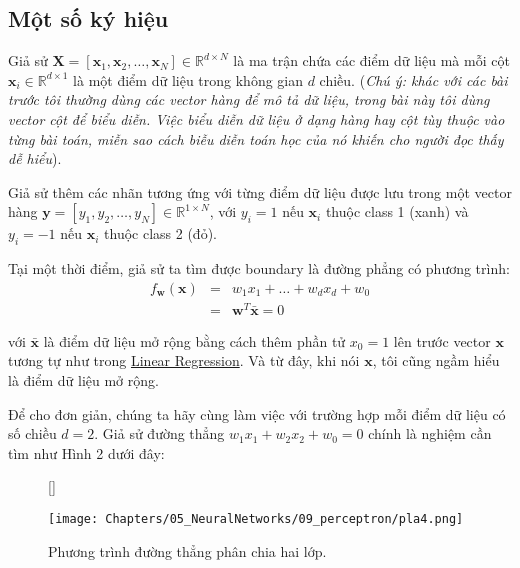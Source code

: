  
\subsection{Một số ký hiệu}
Giả sử $\mathbf{X} = [\mathbf{x}_1, \mathbf{x}_2, \dots, \mathbf{x}_N] \in \mathbb{R}^{d \times N}$ là ma trận chứa các điểm dữ liệu mà mỗi cột $\mathbf{x}_i \in \mathbb{R}^{d\times 1}$ là một điểm dữ liệu trong không gian $d$ chiều. (\textit{Chú ý: khác với các bài trước tôi thường dùng các vector hàng để mô tả dữ liệu, trong bài này tôi dùng vector cột để biểu diễn. Việc biểu diễn dữ liệu ở dạng hàng hay cột tùy thuộc vào từng bài toán, miễn sao cách biễu diễn toán học của nó khiến cho người đọc thấy dễ hiểu}). 
 
Giả sử thêm các nhãn tương ứng với từng điểm dữ liệu được lưu trong một vector hàng $\mathbf{y} = [y_1, y_2, \dots, y_N] \in \mathbb{R}^{1\times N}$, với $y_i = 1$ nếu $\mathbf{x}_i$ thuộc class 1 (xanh) và $y_i = -1$ nếu $\mathbf{x}_i$ thuộc class 2 (đỏ). 
 
Tại một thời điểm, giả sử ta tìm được boundary là đường phẳng có phương trình: 
\begin{eqnarray} 
    f_{\mathbf{w}}(\mathbf{x}) &=& w_1x_1 + \dots + w_dx_d + w_0 \\\  
    &=&\mathbf{w}^T\mathbf{\bar{x}} = 0 
\end{eqnarray} 
 
với $\mathbf{\bar{x}}$ là điểm dữ liệu mở rộng bằng cách thêm phần tử $x_0 = 1$ lên trước vector $\mathbf{x}$ tương tự như trong \href{http://machinelearningcoban.com/2016/12/28/linearregression/}{Linear Regression}. Và từ đây, khi nói $\mathbf{x}$, tôi cũng ngầm hiểu là điểm dữ liệu mở rộng. 
 
Để cho đơn giản, chúng ta hãy cùng làm việc với trường hợp mỗi điểm dữ liệu có số chiều $d = 2$. Giả sử đường thẳng $w_1 x_1 + w_2 x_2 + w_0 = 0$ chính là nghiệm cần tìm như Hình 2 dưới đây: 
 

\begin{figure}[t]
     [\FBwidth]
     {\caption{ 
     Phương trình đường thẳng phân chia hai lớp.
     }
     \label{fig:9_2}}
     { %
     \texttt{[image: Chapters/05\_NeuralNetworks/09\_perceptron/pla4.png]}
     }
 \end{figure}

